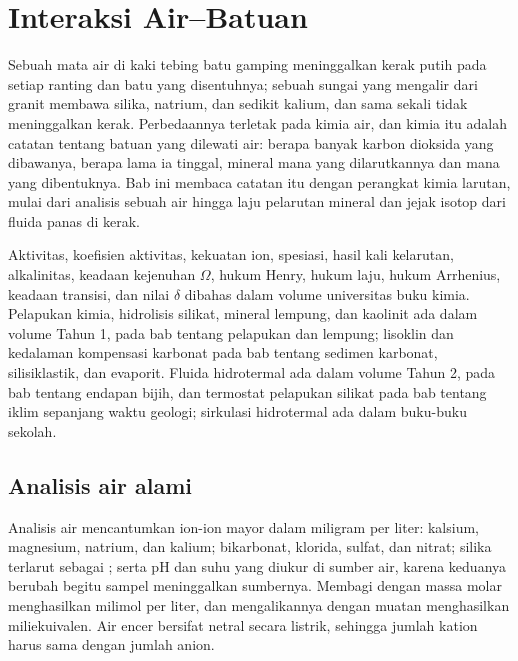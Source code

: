 \chapter{Interaksi Air--Batuan}\label{ch:b3:water-rock-interaction}

Sebuah mata air di kaki tebing batu gamping meninggalkan kerak putih pada setiap
ranting dan batu yang disentuhnya; sebuah sungai yang mengalir dari granit membawa
silika, natrium, dan sedikit kalium, dan sama sekali tidak meninggalkan kerak. Perbedaannya
terletak pada kimia air, dan kimia itu adalah catatan tentang batuan
yang dilewati air: berapa banyak karbon dioksida yang dibawanya, berapa lama ia
tinggal, mineral mana yang dilarutkannya dan mana yang dibentuknya. Bab ini
membaca catatan itu dengan perangkat kimia larutan, mulai dari analisis sebuah
air hingga laju pelarutan mineral dan jejak isotop dari fluida panas di kerak.

\begin{recall}
Aktivitas, koefisien aktivitas, kekuatan ion, spesiasi, hasil kali
kelarutan, alkalinitas, keadaan kejenuhan $\Omega$, hukum Henry, hukum laju,
hukum Arrhenius, keadaan transisi, dan nilai $\delta$ dibahas dalam
volume universitas buku kimia. Pelapukan kimia, hidrolisis
silikat, mineral lempung, dan kaolinit ada dalam volume Tahun 1, pada
bab tentang pelapukan dan lempung; lisoklin dan kedalaman
kompensasi karbonat pada bab tentang sedimen karbonat, silisiklastik, dan evaporit. Fluida
hidrotermal ada dalam volume Tahun 2, pada bab tentang endapan bijih, dan
termostat pelapukan silikat pada bab tentang iklim sepanjang waktu geologi; sirkulasi
hidrotermal ada dalam buku-buku sekolah.
\end{recall}

\section{Analisis air alami}\label{sec:b3:water-rock-interaction:analysis}

Analisis air mencantumkan ion-ion mayor dalam miligram per liter: kalsium,
magnesium, natrium, dan kalium; bikarbonat, klorida, sulfat, dan nitrat;
silika terlarut sebagai ; serta pH dan suhu yang diukur di
sumber air, karena keduanya berubah begitu sampel meninggalkan sumbernya. Membagi dengan
massa molar menghasilkan milimol per liter, dan mengalikannya dengan muatan
menghasilkan miliekuivalen. Air encer bersifat netral secara listrik, sehingga
jumlah kation harus sama dengan jumlah anion.

